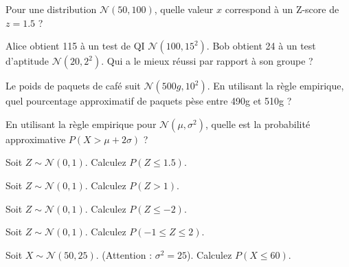\begin{exercicebox}
Pour une distribution $\mathcal{N}(50, 100)$, quelle valeur $x$ correspond à un Z-score de $z = 1.5$ ?
\end{exercicebox}

\begin{exercicebox}
Alice obtient 115 à un test de QI $\mathcal{N}(100, 15^2)$. Bob obtient 24 à un test d'aptitude $\mathcal{N}(20, 2^2)$. Qui a le mieux réussi par rapport à son groupe ?
\end{exercicebox}

\begin{exercicebox}
Le poids de paquets de café suit $\mathcal{N}(500g, 10^2)$.
En utilisant la règle empirique, quel pourcentage approximatif de paquets pèse entre 490g et 510g ?
\end{exercicebox}

\begin{exercicebox}
En utilisant la règle empirique pour $\mathcal{N}(\mu, \sigma^2)$, quelle est la probabilité approximative $P(X > \mu + 2\sigma)$ ?
\end{exercicebox}


\begin{exercicebox}
Soit $Z \sim \mathcal{N}(0, 1)$. Calculez $P(Z \le 1.5)$.
\end{exercicebox}

\begin{exercicebox}
Soit $Z \sim \mathcal{N}(0, 1)$. Calculez $P(Z > 1)$.
\end{exercicebox}

\begin{exercicebox}
Soit $Z \sim \mathcal{N}(0, 1)$. Calculez $P(Z \le -2)$.
\end{exercicebox}

\begin{exercicebox}
Soit $Z \sim \mathcal{N}(0, 1)$. Calculez $P(-1 \le Z \le 2)$.
\end{exercicebox}

\begin{exercicebox}
Soit $X \sim \mathcal{N}(50, 25)$. (Attention : $\sigma^2=25$).
Calculez $P(X \le 60)$.
\end{exercicebox}

